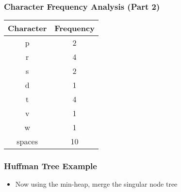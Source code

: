 \documentclass[10pt,aspectratio=43]{beamer}
\begin{document}
\begin{frame}
    \frametitle{\textcolor{myMaroon}{Character Frequency Analysis (Part 2)}}
    
    \begin{center}
        \begin{tabular}{c c}
            \toprule
            \textcolor{myMaroon}{\textbf{Character}} & \textcolor{myMaroon}{\textbf{Frequency}} \\
            \midrule
            p & 2 \\
            r & 4 \\
            s & 2 \\
            d & 1 \\
            t & 4 \\
            v & 1 \\
            w & 1 \\
            spaces & 10 \\
            \bottomrule
        \end{tabular}
    \end{center}

    
\end{frame}




\begin{frame}
    \frametitle{\textcolor{myMaroon}{Huffman Tree Example}}
    
    \begin{itemize}
        \setlength\itemsep{0pt} %
        \setlength\parskip{0pt} %
        \item Now using the min-heap, merge the singular node tree
    \end{itemize}
        \centering

 
\end{frame}
\end{document}
